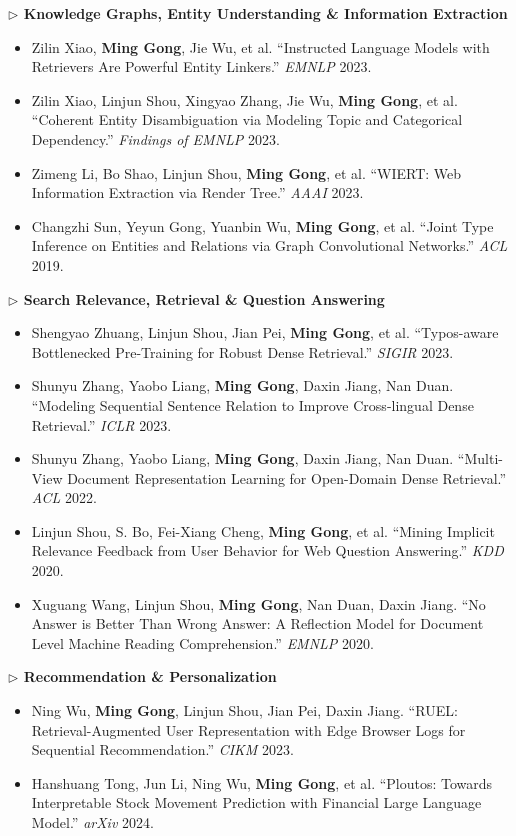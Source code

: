 \documentclass[10.5pt,letterpaper]{article}
\begin{document}
\noindent\textcolor{blue!60!black}{\textbf{$\triangleright$ Knowledge Graphs, Entity Understanding \& Information Extraction}}
\begin{itemize}
  \item Zilin Xiao, \textbf{Ming Gong}, Jie Wu, et al. ``Instructed Language Models with Retrievers Are Powerful Entity Linkers.'' \textit{EMNLP} 2023.
  \item Zilin Xiao, Linjun Shou, Xingyao Zhang, Jie Wu, \textbf{Ming Gong}, et al. ``Coherent Entity Disambiguation via Modeling Topic and Categorical Dependency.'' \textit{Findings of EMNLP} 2023.
  \item Zimeng Li, Bo Shao, Linjun Shou, \textbf{Ming Gong}, et al. ``WIERT: Web Information Extraction via Render Tree.'' \textit{AAAI} 2023.
  \item Changzhi Sun, Yeyun Gong, Yuanbin Wu, \textbf{Ming Gong}, et al. ``Joint Type Inference on Entities and Relations via Graph Convolutional Networks.'' \textit{ACL} 2019.
\end{itemize}

\noindent\textcolor{blue!60!black}{\textbf{$\triangleright$ Search Relevance, Retrieval \& Question Answering}}
\begin{itemize}
  \item Shengyao Zhuang, Linjun Shou, Jian Pei, \textbf{Ming Gong}, et al. ``Typos-aware Bottlenecked Pre-Training for Robust Dense Retrieval.'' \textit{SIGIR} 2023.
  \item Shunyu Zhang, Yaobo Liang, \textbf{Ming Gong}, Daxin Jiang, Nan Duan. ``Modeling Sequential Sentence Relation to Improve Cross-lingual Dense Retrieval.'' \textit{ICLR} 2023.
  \item Shunyu Zhang, Yaobo Liang, \textbf{Ming Gong}, Daxin Jiang, Nan Duan. ``Multi-View Document Representation Learning for Open-Domain Dense Retrieval.'' \textit{ACL} 2022.
  \item Linjun Shou, S. Bo, Fei-Xiang Cheng, \textbf{Ming Gong}, et al. ``Mining Implicit Relevance Feedback from User Behavior for Web Question Answering.'' \textit{KDD} 2020.
  \item Xuguang Wang, Linjun Shou, \textbf{Ming Gong}, Nan Duan, Daxin Jiang. ``No Answer is Better Than Wrong Answer: A Reflection Model for Document Level Machine Reading Comprehension.'' \textit{EMNLP} 2020.
\end{itemize}

\noindent\textcolor{blue!60!black}{\textbf{$\triangleright$ Recommendation \& Personalization}}
\begin{itemize}
  \item Ning Wu, \textbf{Ming Gong}, Linjun Shou, Jian Pei, Daxin Jiang. ``RUEL: Retrieval-Augmented User Representation with Edge Browser Logs for Sequential Recommendation.'' \textit{CIKM} 2023.
  \item Hanshuang Tong, Jun Li, Ning Wu, \textbf{Ming Gong}, et al. ``Ploutos: Towards Interpretable Stock Movement Prediction with Financial Large Language Model.'' \textit{arXiv} 2024.
\end{itemize}
\end{document}
